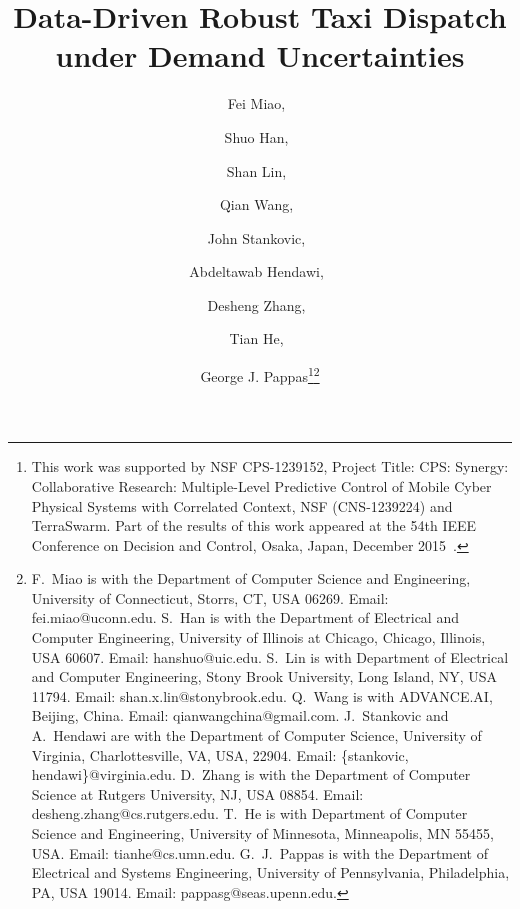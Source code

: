 \documentclass[10pt,twocolumn,twoside,english]{IEEEtran}
\begin{document}
\title{\LARGE \bf Data-Driven Robust Taxi Dispatch under Demand Uncertainties}


\author{Fei Miao,\ \and Shuo Han,\ \and Shan Lin,\ \and Qian Wang,\ \and John Stankovic,\ \and Abdeltawab Hendawi,\ \and Desheng Zhang,\ \and Tian He,\ \and George J. Pappas\thanks{This work was supported by NSF CPS-1239152, Project Title: CPS: Synergy: Collaborative Research: Multiple-Level Predictive Control of Mobile Cyber Physical Systems with Correlated Context, NSF (CNS-1239224) and TerraSwarm. Part of the results of this work appeared at the 54th IEEE Conference on Decision and Control, Osaka, Japan, December 2015~\cite{taxi_cdc2015}. }\thanks{F.~Miao is with the Department of Computer Science and Engineering, University of Connecticut, Storrs, CT, USA 06269. Email: fei.miao@uconn.edu. S.~Han is with the Department of Electrical and Computer Engineering, University of Illinois at Chicago, Chicago, Illinois, USA 60607. Email: hanshuo@uic.edu. S.~Lin is with Department of Electrical and Computer Engineering, Stony Brook University, Long Island, NY, USA 11794. Email: shan.x.lin@stonybrook.edu. Q.~Wang is with ADVANCE.AI, Beijing, China. Email: qianwangchina@gmail.com. J.~Stankovic and A.~Hendawi are with the Department of Computer Science, University of Virginia, Charlottesville, VA,  USA, 22904. Email: \{stankovic, hendawi\}@virginia.edu.  D.~Zhang is with the Department of Computer Science at Rutgers University, NJ, USA 08854. Email: desheng.zhang@cs.rutgers.edu. T.~He is with Department of Computer Science and Engineering, University of Minnesota, Minneapolis, MN 55455, USA. Email: tianhe@cs.umn.edu. G.~J.~Pappas is with the Department of Electrical and Systems Engineering, University of Pennsylvania, Philadelphia, PA, USA 19014. Email: pappasg@seas.upenn.edu.}
}

\maketitle
\end{document}
